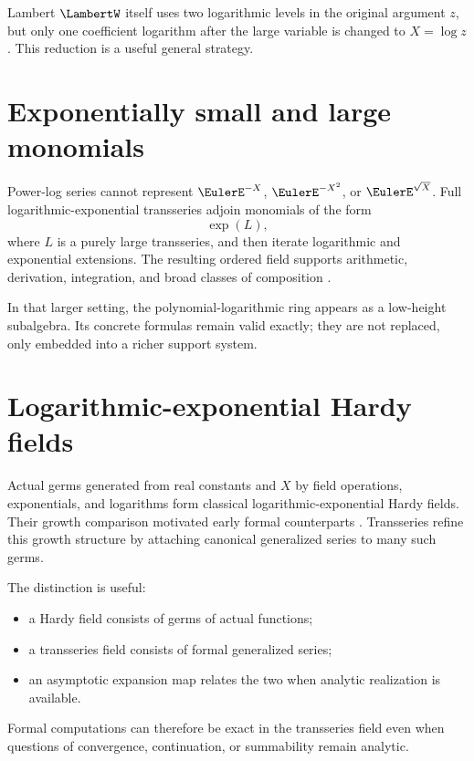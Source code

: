 \documentclass[11pt,oneside,openany]{book}
\begin{document}
Lambert \(\LambertW\) itself uses two logarithmic levels in the original argument
\(z\), but only one coefficient logarithm after the large variable is changed
to \(X=\log z\).  This reduction is a useful general strategy.

\section{Exponentially small and large monomials}
Power-log series cannot represent \(\EulerE^{-X}\), \(\EulerE^{-X^2}\), or
\(\EulerE^{\sqrt X}\).  Full logarithmic-exponential transseries adjoin monomials
of the form
\begin{equation}\label{eq:expmonomial}
 \exp(L),
\end{equation}
where \(L\) is a purely large transseries, and then iterate logarithmic and
exponential extensions.  The resulting ordered field supports arithmetic,
derivation, integration, and broad classes of composition
\cite{vanDerHoeven2006,EdgarBeginners,EdgarComposition}.

In that larger setting, the polynomial-logarithmic ring appears as a low-height
subalgebra.  Its concrete formulas remain valid exactly; they are not replaced,
only embedded into a richer support system.

\section{Logarithmic-exponential Hardy fields}
Actual germs generated from real constants and \(X\) by field operations,
exponentials, and logarithms form classical logarithmic-exponential Hardy
fields.  Their growth comparison motivated early formal counterparts
\cite{Hardy1910,DahnGoering1987,vanDenDriesMacintyreMarker1997}.
Transseries refine this growth structure by attaching canonical generalized
series to many such germs.

The distinction is useful:
\begin{itemize}
\item a Hardy field consists of germs of actual functions;
\item a transseries field consists of formal generalized series;
\item an asymptotic expansion map relates the two when analytic realization is
available.
\end{itemize}
Formal computations can therefore be exact in the transseries field even when
questions of convergence, continuation, or summability remain analytic.
\end{document}
